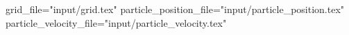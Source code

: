 grid_file="input/grid.tex"
particle_position_file="input/particle_position.tex"
particle_velocity_file="input/particle_velocity.tex"